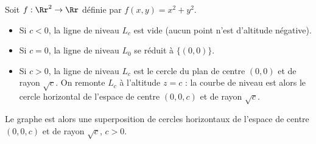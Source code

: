 \documentclass[11pt,class=report,crop=false]{standalone}
\begin{document}
\begin{exemple}
Soit $f : \Rr^2 \to \Rr$ définie par $f(x,y)=x^2+y^2$. 

  \begin{itemize}
    \item Si $c<0$, la ligne de niveau $L_c$ est vide (aucun point n'est d'altitude négative).
    \item Si $c=0$, la ligne de niveau $L_0$ se réduit à $\{(0,0)\}$.
    \item Si $c>0$, la ligne de niveau $L_c$  est le cercle du plan de centre $(0,0)$ et de rayon $\sqrt{c}$. On \og{}remonte\fg{} $L_c$ à l'altitude $z=c$ : la courbe de niveau est alors le cercle horizontal de l'espace de centre $(0,0,c)$ et de rayon $\sqrt{c}$. 
  \end{itemize}
      
Le graphe est alors une superposition de cercles horizontaux de l'espace de centre $(0,0,c)$ et de rayon $\sqrt{c}$, $c>0$.     


\end{exemple}
\end{document}
